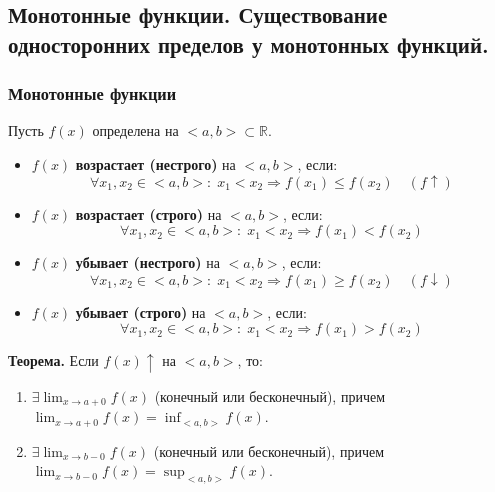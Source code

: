 \subsection{Монотонные функции. Существование односторонних пределов у монотонных функций.}

\subsubsection*{Монотонные функции}
Пусть $f(x)$ определена на $<a, b> \subset \mathbb{R}$.

\begin{tcolorbox}[title=Определения монотонности]
    \begin{itemize}
        \item $f(x)$ \textbf{возрастает (нестрого)} на $<a, b>$, если:
        \[ \forall x_1, x_2 \in <a, b>:\; x_1 < x_2 \Rightarrow f(x_1) \leq f(x_2) \quad (f \uparrow) \]
        
        \item $f(x)$ \textbf{возрастает (строго)} на $<a, b>$, если:
        \[ \forall x_1, x_2 \in <a, b>:\; x_1 < x_2 \Rightarrow f(x_1) < f(x_2) \]
        
        \item $f(x)$ \textbf{убывает (нестрого)} на $<a, b>$, если:
        \[ \forall x_1, x_2 \in <a, b>:\; x_1 < x_2 \Rightarrow f(x_1) \geq f(x_2) \quad (f \downarrow) \]
        
        \item $f(x)$ \textbf{убывает (строго)} на $<a, b>$, если:
        \[ \forall x_1, x_2 \in <a, b>:\; x_1 < x_2 \Rightarrow f(x_1) > f(x_2) \]
    \end{itemize}
\end{tcolorbox}

\textbf{Теорема.} Если $f(x) \uparrow$ на $<a, b>$, то:
\begin{enumerate}
	\item $\exists \lim_{x\to a+0} f(x)$ (конечный или бесконечный), причем $\lim_{x\to a+0} f(x) = \inf_{<a,b>} f(x)$.
	\item $\exists \lim_{x\to b-0} f(x)$ (конечный или бесконечный), причем $\lim_{x\to b-0} f(x) = \sup_{<a,b>} f(x)$.
\end{enumerate}

